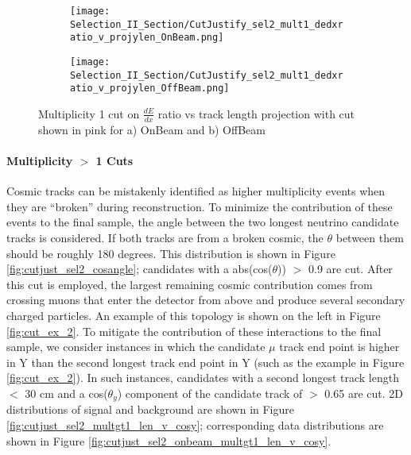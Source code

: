 \begin{figure}[H]
\centering
\begin{subfigure}[t]{0.25\textwidth}
  \centering
  \texttt{[image: Selection\_II\_Section/CutJustify\_sel2\_mult1\_dedxratio\_v\_projylen\_OnBeam.png]}  
  \caption{ }
  \end{subfigure} 
  \hspace{10 mm}
  \begin{subfigure}[t]{0.25\textwidth}
    \centering
\texttt{[image: Selection\_II\_Section/CutJustify\_sel2\_mult1\_dedxratio\_v\_projylen\_OffBeam.png]}
  \caption{ }
  \end{subfigure} 
\caption{Multiplicity 1 cut on $\frac{dE}{dx}$ ratio vs track length projection with cut shown in pink for a) OnBeam and b) OffBeam }
\label{fig:cutjust_sel2_onbeam_mult1_dedxratio_v_leny}

\end{figure}

\clearpage
\paragraph{Multiplicity $>$ 1 Cuts}
Cosmic tracks can be mistakenly identified as higher multiplicity events when they are ``broken'' during reconstruction. To minimize the contribution of these events to the final sample, the angle between the two longest neutrino candidate tracks is considered. If both tracks are from a broken cosmic, the $\theta$ between them should be roughly 180 degrees.  This distribution is shown in Figure \ref{fig:cutjust_sel2_cosangle}; candidates with a abs(cos($\theta$)) $>$ 0.9 are cut.  After this cut is employed, the largest remaining cosmic contribution comes from crossing muons that enter the detector from above and produce several secondary charged particles. An example of this topology is shown on the left in Figure \ref{fig:cut_ex_2}.  To mitigate the contribution of these interactions to the final sample, we consider instances in which the candidate $\mu$ track end point is higher in Y than the second longest track end point in Y (such as the example in Figure \ref{fig:cut_ex_2}).  In such instances, candidates with a second longest track length $<$ 30 cm and a cos($\theta_y$) component of the candidate track of $>$ 0.65 are cut.  2D distributions of signal and background are shown in Figure \ref{fig:cutjust_sel2_multgt1_len_v_cosy}; corresponding data distributions are shown in Figure \ref{fig:cutjust_sel2_onbeam_multgt1_len_v_cosy}. 

